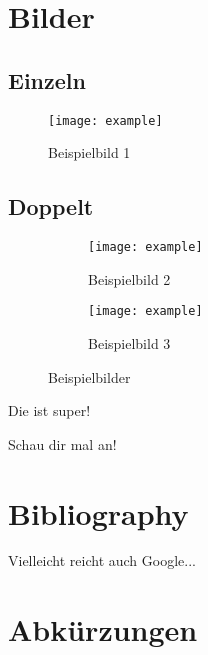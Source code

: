 \chapter{Bilder} \label{sec:pictures}

\section{Einzeln}

\begin{figure}[H]
    \begin{center} 
        \texttt{[image: example]}
        \caption{Beispielbild 1}
        \label{fig:example-1}
    \end{center}
\end{figure}

\section{Doppelt}

\begin{figure}[H]
    \begin{center} 
    \begin{subfigure}[b]{0.48\linewidth}
        \texttt{[image: example]}
        \caption{Beispielbild 2}
        \label{fig:example-2}
    \end{subfigure}
    \begin{subfigure}[b]{0.48\linewidth}
        \texttt{[image: example]}
        \caption{Beispielbild 3}
        \label{fig:example-3}
    \end{subfigure}
    \caption{Beispielbilder}
    \label{fig:examples}
    \end{center}
\end{figure}

Die  ist super!

Schau dir mal  an!

\chapter{Bibliography}

\cite[vgl.][]{example-book}

\cite[][ein Bild]{example-online}

Vielleicht reicht auch Google...

\chapter{Abkürzungen}

